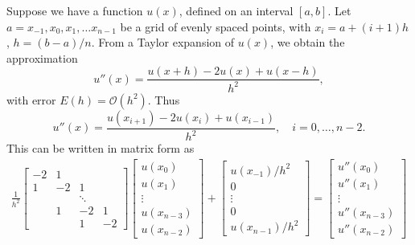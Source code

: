 \label{lab:finitedifference2}

Suppose we have a function $u(x)$, defined on an interval $[a,b]$.
Let $a = x_{-1}, x_0, x_1, \ldots x_{n-1}$ be a grid of evenly spaced points, with $x_i = a + (i+1)h$, $h = (b-a)/n$.
From a Taylor expansion of $u(x)$, we obtain the approximation
\[u''(x) = \frac{u(x+h) - 2u(x) + u(x-h)}{h^2}, \]
with error $E(h) = \mathcal{O}(h^2)$.
Thus
\[u''(x) = \frac{u(x_{i+1}) - 2u(x_i) + u(x_{i-1})}{h^2}, \quad i = 0, \ldots, n-2.\]
This can be written in matrix form as
\begin{align}
\frac{1}{h^2}
\begin{bmatrix}
-2 & 1 & \\
1 & -2 & 1  \\
& &\ddots & \\
 & 1 & -2 & 1 \\
 & & 1 & -2
\end{bmatrix}
\begin{bmatrix}
u(x_0) \\ u(x_1)\\ \vdots  \\ u(x_{n-3}) \\ u(x_{n-2})
\end{bmatrix} +
\begin{bmatrix}
u(x_{-1})/h^2 \\ 0 \\ \vdots  \\ 0 \\ u(x_{n-1})/h^2
\end{bmatrix} =
\begin{bmatrix}
u''(x_0) \\ u''(x_1)\\ \vdots  \\ u''(x_{n-3}) \\ u''(x_{n-2})
\end{bmatrix}\label{finitedifference2:upp}
\end{align}

